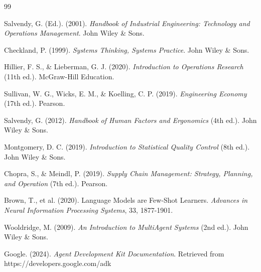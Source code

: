 \documentclass[12pt,a4paper]{article}
\begin{document}

\begin{thebibliography}{99}

Salvendy, G. (Ed.). (2001). \textit{Handbook of Industrial Engineering: Technology and Operations Management}. John Wiley \& Sons.

Checkland, P. (1999). \textit{Systems Thinking, Systems Practice}. John Wiley \& Sons.

Hillier, F. S., \& Lieberman, G. J. (2020). \textit{Introduction to Operations Research} (11th ed.). McGraw-Hill Education.

Sullivan, W. G., Wicks, E. M., \& Koelling, C. P. (2019). \textit{Engineering Economy} (17th ed.). Pearson.

Salvendy, G. (2012). \textit{Handbook of Human Factors and Ergonomics} (4th ed.). John Wiley \& Sons.

Montgomery, D. C. (2019). \textit{Introduction to Statistical Quality Control} (8th ed.). John Wiley \& Sons.

Chopra, S., \& Meindl, P. (2019). \textit{Supply Chain Management: Strategy, Planning, and Operation} (7th ed.). Pearson.

Brown, T., et al. (2020). Language Models are Few-Shot Learners. \textit{Advances in Neural Information Processing Systems}, 33, 1877-1901.

Wooldridge, M. (2009). \textit{An Introduction to MultiAgent Systems} (2nd ed.). John Wiley \& Sons.

Google. (2024). \textit{Agent Development Kit Documentation}. Retrieved from https://developers.google.com/adk

\end{thebibliography}
\end{document}
